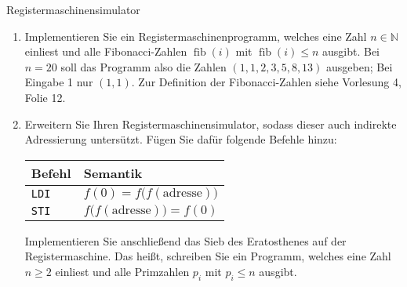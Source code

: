 \documentclass[11pt,a4paper]{article}
\begin{document}
\begin{aufgabe}{4}{Registermaschinensimulator}
\begin{enumerate}[label=\alph*)]
    \item Implementieren Sie ein Registermaschinenprogramm, welches eine Zahl $n \in \mathbb{N}$ einliest und alle Fibonacci-Zahlen $\operatorname{fib}(i)$ mit $\operatorname{fib}(i) \leq n$ ausgibt. Bei $n = 20$ soll das Programm also die Zahlen $(1, 1, 2, 3, 5, 8, 13)$ aus\-ge\-ben; Bei Eingabe 1 nur $(1, 1)$.
    Zur Definition der Fibonacci-Zahlen siehe Vorlesung 4, Folie 12.

    \item \hard Erweitern Sie Ihren Registermaschinensimulator, sodass dieser auch indirekte Adressierung untersützt.
    Fügen Sie dafür folgende Befehle hinzu:
    \begin{table}[h!]
        \centering
        \begin{tabular}{|l|l|}
        \hline
        \textbf{Befehl} & \textbf{Semantik} \\ \hline
        \texttt{LDI} & $f(0) = f\big(f(\mathrm{adresse})\big)$ \\ \hline
        \texttt{STI} & $f\big(f(\mathrm{adresse})\big) = f(0)$ \\ \hline
        \end{tabular}
    \end{table}

    Implementieren Sie anschließend das Sieb des Eratosthenes auf der Registermaschine.
    Das heißt, schreiben Sie ein Programm, welches eine Zahl $n \geq 2$ einliest und alle Primzahlen $p_i$ mit $p_i \leq n$ ausgibt.
\end{enumerate}
\end{aufgabe}
\end{document}
